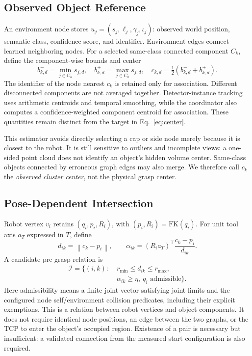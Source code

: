 \documentclass[letterpaper,10pt,conference]{ieeeconf}
\newcommand{\norm}[1]{\left\lVert #1\right\rVert}
\begin{document}
\subsection{Observed Object Reference}
An environment node stores $u_j=(s_j,\ell_j,\gamma_j,\iota_j)$: observed world position, semantic class, confidence score, and identifier. Environment edges connect learned neighboring nodes. For a selected same-class connected component $C_k$, define the component-wise bounds and center
\begin{equation}
 b_{k,d}^{-}=\min_{j\in C_k}s_{j,d},\quad
 b_{k,d}^{+}=\max_{j\in C_k}s_{j,d},\quad
 c_{k,d}=\tfrac12(b_{k,d}^{-}+b_{k,d}^{+}).
 \label{eq:center}
\end{equation}
The identifier of the node nearest $c_k$ is retained only for association. Different disconnected components are not averaged together. Detector-instance tracking uses arithmetic centroids and temporal smoothing, while the coordinator also computes a confidence-weighted component centroid for association. These quantities remain distinct from the target in Eq.~\eqref{eq:center}.

This estimator avoids directly selecting a cap or side node merely because it is closest to the robot. It is still sensitive to outliers and incomplete views: a one-sided point cloud does not identify an object's hidden volume center. Same-class objects connected by erroneous graph edges may also merge. We therefore call $c_k$ the \emph{observed cluster center}, not the physical grasp center.

\subsection{Pose-Dependent Intersection}
Robot vertex $v_i$ retains $(q_i,p_i,R_i)$, with $(p_i,R_i)=\mathrm{FK}(q_i)$. For unit tool axis $a_T$ expressed in $T$, define
\begin{equation}
 d_{ik}=\norm{c_k-p_i},\qquad
 \alpha_{ik}=(R_i a_T)^\top\frac{c_k-p_i}{d_{ik}}.
 \label{eq:alignment}
\end{equation}
A candidate pre-grasp relation is
\begin{equation}
 \begin{split}
 \mathcal I=\{(i,k):\;&r_{\min}\le d_{ik}\le r_{\max},\\
 &\alpha_{ik}\ge\eta,\ q_i\text{ admissible}\}.
 \end{split}
 \label{eq:relation}
\end{equation}
Here admissibility means a finite joint vector satisfying joint limits and the configured node self/environment collision predicates, including their explicit exemptions. This is a relation between robot vertices and object components. It does not require identical node positions, an edge between the two graphs, or the TCP to enter the object's occupied region. Existence of a pair is necessary but insufficient: a validated connection from the measured start configuration is also required.
\end{document}
